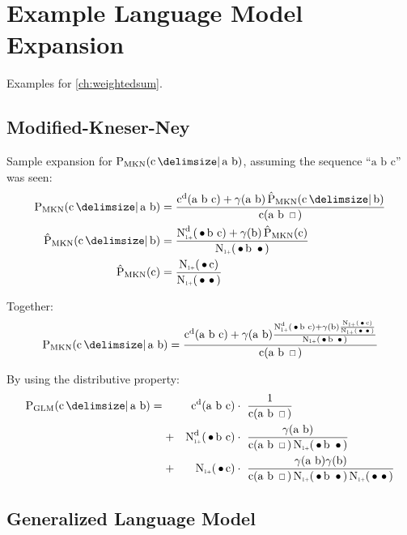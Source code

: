 \chapter{Example Language Model Expansion}
\label{app:expansion}

Examples for \cref{ch:weightedsum}.

\section{Modified-Kneser-Ney}

\newcommand{\ProbMKNcab}[1]
  {\frac{\DiscountedCount(\text{a b c}) + \gamma(\text{a b}) #1}{\Count(\text{a b \Skp})}}
\newcommand{\ProbMKNcb}[1]
  {\frac{\DiscountedCount*(\text{\WSkp b c}) + \gamma(\text{b}) #1}{\ContCountIp(\text{\WSkp b \WSkp})}}
\newcommand{\ProbMKNc}
  {\frac{\ContCountIp(\text{\WSkp c})}{\ContCountIp(\text{\WSkp \WSkp})}}

Sample expansion for $\ProbMKN{\text{c}}{\text{a b}}$, assuming the sequence
``$\text{a b c}$'' was seen:
\begin{align}
  \ProbMKN {\text{c}}{\text{a b}} &= \ProbMKNcab{\ProbMKN*{\text{c}}{\text{b}}} \\
  \ProbMKN*{\text{c}}{\text{b}}   &= \ProbMKNcb{\ProbMKN*{\text{c}}} \\
  \ProbMKN*{\text{c}}             &= \ProbMKNc
\end{align}

Together:
\begin{equation}
  \ProbMKN {\text{c}}{\text{a b}} = \ProbMKNcab{\ProbMKNcb{\ProbMKNc}}
\end{equation}

By using the distributive property:
\begin{align}
  \ProbGLM {\text{c}}{\text{a b}} = {}
    & & \DiscountedCount (\text{a b c})     & \cdot\ \frac{1}{\Count(\text{a b \Skp})} \\
    &+& \DiscountedCount*(\text{\WSkp b c}) & \cdot\ \frac{\gamma(\text{a b})}{\Count(\text{a b \Skp}) \ContCountIp(\text{\WSkp b \WSkp})} \nonumber \\
    &+& \ContCountIp(\text{\WSkp c})        & \cdot\ \frac{\gamma(\text{a b}) \gamma(\text{b})}{\Count(\text{a b \Skp}) \ContCountIp(\text{\WSkp b \WSkp}) \ContCountIp(\text{\WSkp \WSkp})} \nonumber
\end{align}

\clearpage
\section{Generalized Language Model}

